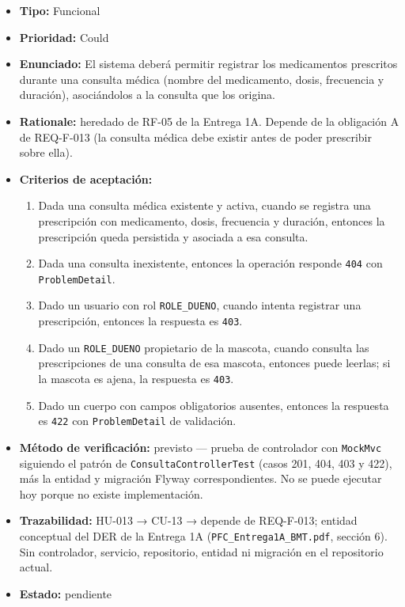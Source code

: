 \documentclass[
  spanish,
]{article}
\providecommand{\tightlist}{%
  \setlength{\itemsep}{0pt}\setlength{\parskip}{0pt}}
\begin{document}
\begin{itemize}
\tightlist
\item
  \textbf{Tipo:} Funcional
\item
  \textbf{Prioridad:} Could
\item
  \textbf{Enunciado:} El sistema deberá permitir registrar los
  medicamentos prescritos durante una consulta médica (nombre del
  medicamento, dosis, frecuencia y duración), asociándolos a la consulta
  que los origina.
\item
  \textbf{Rationale:} heredado de RF-05 de la Entrega 1A. Depende de la
  obligación A de REQ-F-013 (la consulta médica debe existir antes de
  poder prescribir sobre ella).
\item
  \textbf{Criterios de aceptación:}

  \begin{enumerate}
  \def\labelenumi{\arabic{enumi}.}
  \tightlist
  \item
    Dada una consulta médica existente y activa, cuando se registra una
    prescripción con medicamento, dosis, frecuencia y duración, entonces
    la prescripción queda persistida y asociada a esa consulta.
  \item
    Dada una consulta inexistente, entonces la operación responde
    \texttt{404} con \texttt{Problem\allowbreak{}Detail}.
  \item
    Dado un usuario con rol \texttt{ROLE\_\allowbreak{}DUENO}, cuando intenta
    registrar una prescripción, entonces la respuesta es \texttt{403}.
  \item
    Dado un \texttt{ROLE\_\allowbreak{}DUENO} propietario de la mascota, cuando
    consulta las prescripciones de una consulta de esa mascota, entonces
    puede leerlas; si la mascota es ajena, la respuesta es \texttt{403}.
  \item
    Dado un cuerpo con campos obligatorios ausentes, entonces la
    respuesta es \texttt{422} con \texttt{Problem\allowbreak{}Detail} de validación.
  \end{enumerate}
\item
  \textbf{Método de verificación:} previsto --- prueba de controlador
  con \texttt{Mock\allowbreak{}Mvc} siguiendo el patrón de
  \texttt{Consulta\allowbreak{}Controller\allowbreak{}Test} (casos 201, 404, 403 y 422), más la
  entidad y migración Flyway correspondientes. No se puede ejecutar hoy
  porque no existe implementación.
\item
  \textbf{Trazabilidad:} HU-013 → CU-13 → depende de REQ-F-013; entidad
  conceptual del DER de la Entrega 1A (\texttt{PFC\_\allowbreak{}Entrega1\allowbreak{}A\_\allowbreak{}BMT.\allowbreak{}pdf},
  sección 6). Sin controlador, servicio, repositorio, entidad ni
  migración en el repositorio actual.
\item
  \textbf{Estado:} pendiente
\end{itemize}
\end{document}
